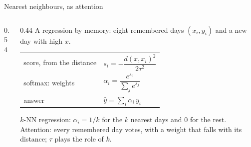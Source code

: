 \documentclass[aspect-ratio=16:9,11pt,frame-title-arg]{ltx-talk}
\begin{document}
\begin{frame}[t]{Nearest neighbours, as attention}
\begin{columns}[c]
\begin{column}{0.54\textwidth}
    \end{column}
    \begin{column}{0.44\textwidth}
      {\small A regression by memory: eight remembered days $(x_i, y_i)$ and a new day with high $x$.}
      \par\vspace{2mm}
      {\small\begin{tabular}{@{}l@{\quad}l@{}}
        score, from the distance & $s_i = -\dfrac{d(x, x_i)^2}{2\tau^2}$ \\[3mm]
        \alert{softmax}: weights & $\alpha_i = \dfrac{e^{s_i}}{\sum_j e^{s_j}}$ \\[3mm]
        answer & $\hat y = \sum_i \alpha_i\, y_i$
      \end{tabular}}
      \par\vspace{2mm}
      {\footnotesize
      $k$-NN regression: $\alpha_i = 1/k$ for the $k$ nearest days and $0$ for the rest.
      Attention: every remembered day votes, with a weight that falls with its distance; $\tau$ plays the role of $k$.}
      \par\vspace{1.5mm}
      {\scriptsize{}}
    \end{column}
  \end{columns}
\end{frame}
\end{document}
